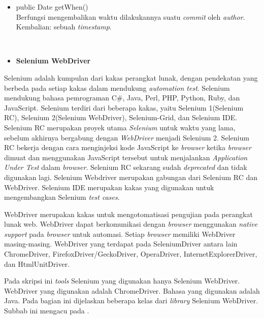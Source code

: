 \documentclass[a4paper,twoside]{article}
\begin{document}
\begin{enumerate}
\begin{itemize}
\item public Date getWhen()\\
Berfungsi mengembalikan waktu dilakukannya suatu \textit{commit} oleh \textit{author}.\\
Kembalian: sebuah \textit{timestamp}.
\end{itemize}

\ \\
\begin{itemize}
\item \textbf{Selenium WebDriver}\\
\end{itemize}
Selenium adalah kumpulan dari kakas perangkat lunak, dengan pendekatan yang berbeda pada setiap kakas dalam mendukung \textit{automation test}\cite{Selenium_doc}. Selenium mendukung bahasa pemrograman C\#, Java, Perl, PHP, Python, Ruby, dan JavaScript. Selenium terdiri dari beberapa kakas, yaitu Selenium 1(Selenium RC), Selenium 2(Selenium WebDriver), Selenium-Grid, dan Selenium IDE. Selenium RC merupakan proyek utama \textit{Selenium} untuk waktu yang lama, sebelum akhirnya bergabung dengan \textit{WebDriver} menjadi Selenium 2. Selenium RC bekerja dengan cara menginjeksi kode JavaScript ke \textit{browser} ketika \textit{browser} dimuat dan menggunakan JavaScript tersebut untuk menjalankan \textit{Application Under Test} dalam \textit{browser}. Selenium RC sekarang sudah \textit{deprecated} dan tidak digunakan lagi. Selenium Webdriver merupakan gabungan dari Selenium RC dan WebDriver. Selenium IDE merupakan kakas yang digunakan untuk mengembangkan Selenium \textit{test cases}.

WebDriver merupakan kakas untuk mengotomatisasi pengujian pada perangkat lunak web\cite{Selenium_doc}. WebDriver dapat berkomunikasi dengan \textit{browser} menggunakan \textit{native support} pada \textit{browser} untuk automasi. Setiap \textit{browser} memiliki WebDriver masing-masing. WebDriver yang terdapat pada SeleniumDriver antara lain ChromeDriver, FirefoxDriver/GeckoDriver, OperaDriver, InternetExplorerDriver, dan HtmlUnitDriver. 

Pada skripsi ini \textit{tools} Selenium yang digunakan hanya Selenium WebDriver. WebDriver yang digunakan adalah ChromeDriver. Bahasa yang digunakan adalah Java. Pada bagian ini dijelaskan beberapa kelas dari \textit{library} Selenium WebDriver. Subbab ini mengacu pada \cite{Selenium_java_doc}.


\end{enumerate}
\end{document}
